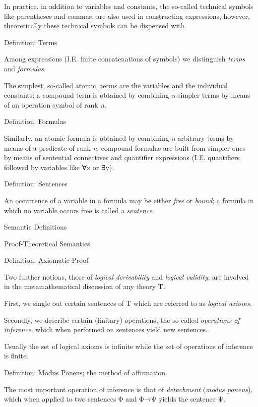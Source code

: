 In practice, in addition to variables and constants, the so-called
technical symbols like parentheses and commas, are also used in
constructing expressions; however, theoretically these technical symbols
can be dispensed with.

\protect\hypertarget{anchor-6}{}{}Definition: Terms

Among expressions (I.E. finite concatenations of symbols) we distinguish
\emph{terms} and \emph{formulas}.

The simplest, so-called atomic, terms are the variables and the
individual constants; a compound term is obtained by combining \emph{n}
simpler terms by means of an operation symbol of rank \emph{n}.

\protect\hypertarget{anchor-7}{}{}Definition: Formulas

Similarly, an atomic formula is obtained by combining \emph{n} arbitrary
terms by means of a predicate of rank \emph{n}; compound formulas are
built from simpler ones by means of sentential connectives and
quantifier expressions (I.E. quantifiers followed by variables like ∀x
or ∃y).

\protect\hypertarget{anchor-8}{}{}Definition: Sentences

An occurrence of a variable in a formula may be either \emph{free} or
\emph{bound}; a formula in which no variable occurs free is called a
\emph{sentence}.

\protect\hypertarget{anchor-9}{}{}Semantic Definitions

\protect\hypertarget{anchor-10}{}{}Proof-Theoretical Semantics

\protect\hypertarget{anchor-11}{}{}Definition: Axiomatic Proof

Two further notions, those of \emph{logical derivability} and
\emph{logical validity}, are involved in the metamathematical discussion
of any theory T.

First, we single out certain sentences of T which are referred to as
\emph{logical axioms}.

Secondly, we describe certain (finitary) operations, the so-called
\emph{operations of inference}, which when performed on sentences yield
new sentences.

Usually the set of logical axioms is infinite while the set of
operations of inference is finite.

\protect\hypertarget{anchor-12}{}{}Definition: Modus Ponens; the method
of affirmation.

The most important operation of inference is that of \emph{detachment}
(\emph{modus ponens}), which when applied to two sentences Φ and Φ→Ψ
yields the sentence Ψ.

